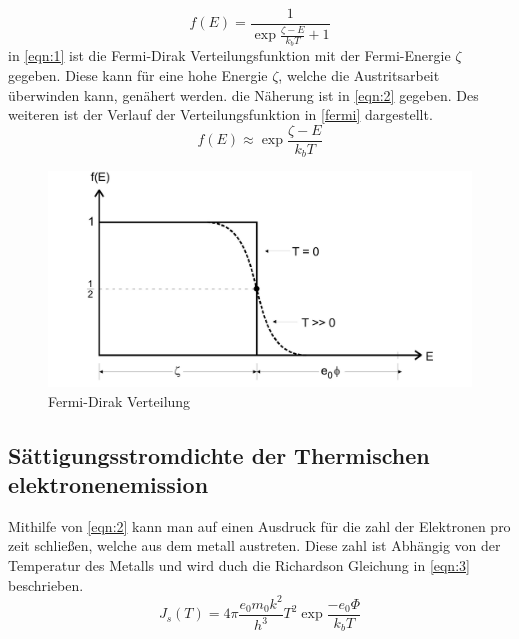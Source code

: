 \begin{equation}
    \label{eqn:1}
    f\left(E\right) = \frac{1}{\exp{\frac{\zeta-E}{k_b T} + 1}}
\end{equation}
\noindent in \autoref{eqn:1} ist die Fermi-Dirak Verteilungsfunktion mit der Fermi-Energie $\zeta$ gegeben. Diese kann 
für eine hohe Energie $\zeta$, welche die Austritsarbeit überwinden kann, genähert werden. die Näherung ist in \autoref{eqn:2} 
gegeben. Des weiteren ist der Verlauf der Verteilungsfunktion in \autoref{fermi} dargestellt.
\begin{equation}
    \label{eqn:2}
    f\left(E\right) \approx \exp{\frac{\zeta-E}{k_b T}}
\end{equation}
\begin{figure}[H]
    \centering
        \centering
        \includegraphics[width=\textwidth]{Bilder/Fermi-Dirac.jpg}
        \caption{Fermi-Dirak Verteilung}
    \hfill
    \label{fig:fermi}
\end{figure}

\subsection{Sättigungsstromdichte der Thermischen elektronenemission}
Mithilfe von \autoref{eqn:2} kann man auf einen Ausdruck für die zahl der Elektronen pro zeit schließen, welche 
aus dem metall austreten. Diese zahl ist Abhängig von der Temperatur des Metalls und wird duch die Richardson Gleichung 
in \autoref{eqn:3} beschrieben.
\begin{equation}
    \label{eqn:2}
    J_s \left(T\right) = 4\pi \frac{e_0m_0k^2}{h^3}T^2\exp{\frac{-e_0\Phi}{k_b T}}
\end{equation}



